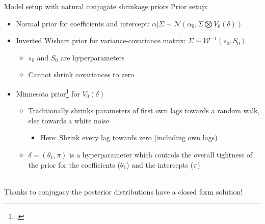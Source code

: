 \begin{frame}{Model setup with natural conjugate shrinkage priors}
    Prior setup:
    \begin{itemize}
        \item Normal prior for coefficients and intercept: $\alpha | \Sigma \sim \mathcal{N}(\alpha_0, \Sigma \bigotimes V_0(\delta))$
        \item Inverted Wishart prior for variance-covariance matrix: $\Sigma \sim \mathcal{W}^{-1}(s_0, S_0)$
            \begin{itemize}
                \item $s_0$ and $S_0$ are hyperparameters
                \item Cannot shrink covariances to zero
            \end{itemize}
        \item Minnesota prior\footcite{kadiyala_numerical_1997,koop_forecasting_2013,banbura_large_2010} for $V_0(\delta)$
            \begin{itemize}
                \item Traditionally shrinks parameters of first own lags towards a random walk, else towards a white noise
                    \begin{itemize}
                        \item Here: Shrink every lag towards zero (including own lags)
                    \end{itemize}
                \item $\delta = (\theta_1, \pi)$ is a hyperparameter which controls the overall tightness of the prior for the coefficients ($\theta_1$) and the intercepts ($\pi$)
            \end{itemize}
    \end{itemize}
    ~\\
    Thanks to conjugacy the posterior distributions have a closed form solution!
\end{frame}

